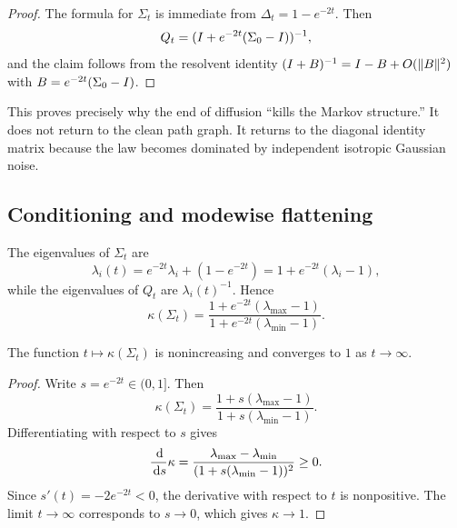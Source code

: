 \documentclass[11pt]{article}
\begin{document}
\begin{proof}
The formula for $\Sigma_t$ is immediate from $\Delta_t=1-e^{-2t}$. Then
\begin{equation}
 Q_t=(I+e^{-2t}(\Sigma_0-I))^{-1},
\end{equation}
and the claim follows from the resolvent identity $(I+B)^{-1}=I-B+O(\lVert B\rVert^2)$ with $B=e^{-2t}(\Sigma_0-I)$.
\end{proof}

This proves precisely why the end of diffusion ``kills the Markov structure.'' It does not return to the clean path graph. It returns to the diagonal identity matrix because the law becomes dominated by independent isotropic Gaussian noise.

\subsection{Conditioning and modewise flattening}

The eigenvalues of $\Sigma_t$ are
\begin{equation}
 \lambda_i(t)=e^{-2t}\lambda_i+(1-e^{-2t})=1+e^{-2t}(\lambda_i-1),
\end{equation}
while the eigenvalues of $Q_t$ are $\lambda_i(t)^{-1}$. Hence
\begin{equation}\label{eq:kappa_formula}
 \kappa(\Sigma_t)
 =\frac{1+e^{-2t}(\lambda_{\max}-1)}{1+e^{-2t}(\lambda_{\min}-1)}.
\end{equation}

\begin{proposition}
The function $t\mapsto \kappa(\Sigma_t)$ is nonincreasing and converges to $1$ as $t\to\infty$.
\end{proposition}

\begin{proof}
Write $s=e^{-2t}\in(0,1]$. Then
\begin{equation}
 \kappa(\Sigma_t)=\frac{1+s(\lambda_{\max}-1)}{1+s(\lambda_{\min}-1)}.
\end{equation}
Differentiating with respect to $s$ gives
\begin{equation}
 \frac{\,\mathrm{d}}{\,\mathrm{d} s}\kappa
 =\frac{\lambda_{\max}-\lambda_{\min}}{(1+s(\lambda_{\min}-1))^2}\geq 0.
\end{equation}
Since $s'(t)=-2e^{-2t}<0$, the derivative with respect to $t$ is nonpositive. The limit $t\to\infty$ corresponds to $s\to 0$, which gives $\kappa\to 1$.
\end{proof}
\end{document}
